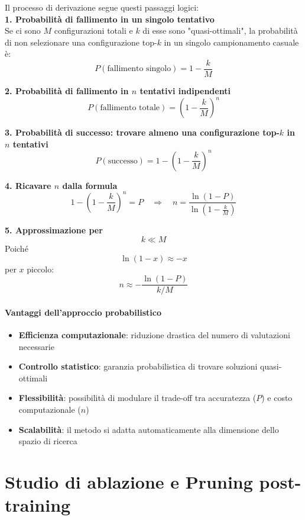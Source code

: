 \documentclass[a4paper,12pt]{report}
\begin{document}
	Il processo di derivazione segue questi passaggi logici: \\
	
	\textbf{1. Probabilità di fallimento in un singolo tentativo} \\
	Se ci sono $M$ configurazioni totali e $k$ di esse sono "quasi-ottimali", la probabilità di non selezionare una configurazione top-$k$ in un singolo campionamento casuale è:
	$$
	P(\text{fallimento singolo}) = 1 - \frac{k}{M}
	$$
	
	\textbf{2. Probabilità di fallimento in $n$ tentativi indipendenti} \\
	$$
	P(\text{fallimento totale}) = \left(1 - \frac{k}{M}\right)^n
	$$
	
	\textbf{3. Probabilità di successo: trovare almeno una configurazione top-$k$ in $n$ tentativi } \\
	$$
	P(\text{successo}) = 1 - \left(1 - \frac{k}{M}\right)^n
	$$
	
	\textbf{4. Ricavare $n$ dalla formula} \\
	$$
	1 - \left(1 - \frac{k}{M} \right)^n = P
	\quad \Longrightarrow \quad
	n = \frac{\ln(1 - P)}{\ln\left(1 - \frac{k}{M} \right)}
	$$
	
	\textbf{5. Approssimazione per}
	$$k \ll M$$
	Poiché
	$$ \ln(1 - x) \approx -x $$
	per \(x\) piccolo: \\
	$$
	n \approx - \frac{\ln(1 - P)}{k/M}
	$$
	
	\subsubsection{Vantaggi dell'approccio probabilistico}
	\begin{itemize}
		\item \textbf{Efficienza computazionale}: riduzione drastica del numero di valutazioni necessarie
		\item \textbf{Controllo statistico}: garanzia probabilistica di trovare soluzioni quasi-ottimali
		\item \textbf{Flessibilità}: possibilità di modulare il trade-off tra accuratezza ($P$) e costo computazionale ($n$)
		\item \textbf{Scalabilità}: il metodo si adatta automaticamente alla dimensione dello spazio di ricerca
	\end{itemize}
	
	\chapter{Studio di ablazione e Pruning post-training}
	
\end{document}
